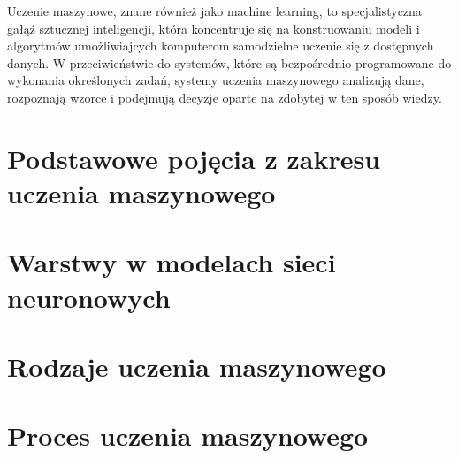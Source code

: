 Uczenie maszynowe, znane również jako machine learning, to specjalistyczna gałąź sztucznej inteligencji,
która koncentruje się na konstruowaniu modeli i algorytmów umożliwiajcych komputerom samodzielne uczenie się z dostępnych danych.
W przeciwieństwie do systemów, które są bezpośrednio programowane do wykonania określonych zadań,
systemy uczenia maszynowego analizują dane, rozpoznają wzorce i podejmują decyzje oparte na zdobytej w ten sposób wiedzy.

\section{Podstawowe pojęcia z zakresu uczenia maszynowego}


\section{Warstwy w modelach sieci neuronowych}


\section{Rodzaje uczenia maszynowego}


\section{Proces uczenia maszynowego}
